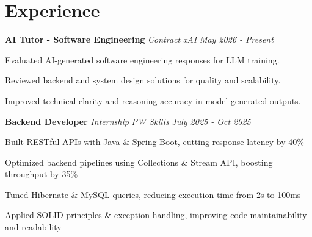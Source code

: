 \section{Experience}

\noindent\textbf{AI Tutor - Software Engineering} \textbar{} \textit{Contract} \textbar{} \textit{xAI} \hfill \textit{May 2026 - Present}
\begin{itemizecompact}
  \item Evaluated AI-generated software engineering responses for LLM training.
  \item Reviewed backend and system design solutions for quality and scalability.
  \item Improved technical clarity and reasoning accuracy in model-generated outputs.
\end{itemizecompact}

\noindent\textbf{Backend Developer} \textbar{} \textit{Internship} \textbar{} \textit{PW Skills} \hfill \textit{July 2025 - Oct 2025}
\begin{itemizecompact}
  \item Built RESTful APIs with Java \& Spring Boot, cutting response latency by 40\%
  \item Optimized backend pipelines using Collections \& Stream API, boosting throughput by 35\%
  \item Tuned Hibernate \& MySQL queries, reducing execution time from 2s to 100ms
  \item Applied SOLID principles \& exception handling, improving code maintainability and readability
\end{itemizecompact}

